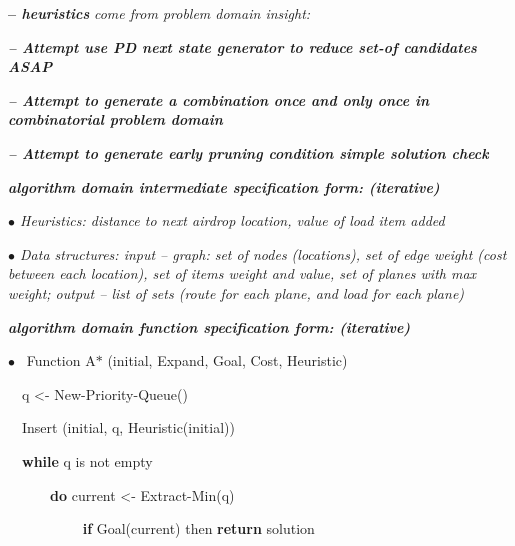 \documentclass[journal]{IEEEtran}
\begin{document}
\textbf{–  \textit{{heuristics }}}\textit{come from problem domain insight:}\par

\textbf{\textit{{-- Attempt use PD next state generator to reduce set-of candidates}}{ \textit{ASAP}}}\par

\textbf{\textit{{-- Attempt to generate a combination once and only once in combinatorial problem domain}}}\par

\textbf{\textit{{-- Attempt to generate early pruning condition simple solution check}}}\par

\vspace{\baselineskip}

\textbf{\textit{algorithm domain intermediate speciﬁcation form: (iterative)}}\par

\textit{$\bullet$  Heuristics: distance to next airdrop location, value of load item added}\par

\textit{$\bullet$  Data structures: input – graph: set of nodes (locations), set of edge weight (cost between each location), set of items weight and value, set of planes with max weight; output – list of sets (route for each plane, and load for each plane)}\par

\vspace{\baselineskip}

\textbf{\textit{algorithm domain function speciﬁcation form:  (iterative)}}\par

\textit{$\bullet$  }\  Function A$\ast$ (initial, Expand, Goal, Cost, Heuristic)\par

\ \  q <- New-Priority-Queue()\par

\ \  Insert (initial, q, Heuristic(initial))\par

\ \  \textbf{while} q is not empty\par

\ \ \ \ \ \  \textbf{do} current <- Extract-Min(q)\par

\ \ \ \ \ \ \ \ \ \  \textbf{ if} Goal(current) then \textbf{return} solution\par
\end{document}

